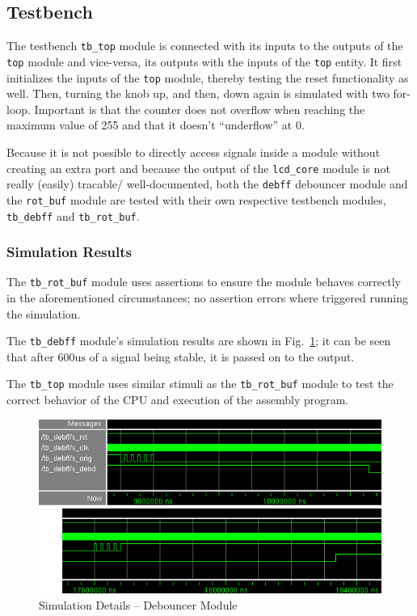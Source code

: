 \documentclass[a4paper,10pt]{scrartcl}
\begin{document}




\subsection{Testbench}
\label{sec:bench}


The testbench \texttt{tb\_top} module is connected with its inputs to the outputs of the \texttt{top} module and vice-versa, its outputs with the inputs of the \texttt{top} entity. 
It first initializes the inputs of the \texttt{top} module, thereby testing the reset functionality as well. 
Then, turning the knob up, and then, down again is simulated with two for-loop. 
Important is that the counter does not overflow when reaching the maximum value of 255 and that it doesn't ``underflow'' at 0.

Because it is not possible to directly access signals inside a module without creating an extra port and because the output of the \texttt{lcd\_core} module is not really (easily) tracable/ well-documented, both the \texttt{debff} debouncer module and the \texttt{rot\_buf} module are tested with their own respective testbench modules, \texttt{tb\_debff} and \texttt{tb\_rot\_buf}. 









\subsubsection{Simulation Results}

The \texttt{tb\_rot\_buf} module uses assertions to ensure the module behaves correctly in the aforementioned circumstances; no assertion errors where triggered running the simulation. 

The \texttt{tb\_debff} module's simulation results are shown in Fig.\ \ref{fig:debff01}; it can be seen that after $600\mathrm{us}$ of a signal being stable, it is passed on to the output. 

The \texttt{tb\_top} module uses similar stimuli as the \texttt{tb\_rot\_buf} module to test the correct behavior of the CPU and execution of the assembly program. 

\begin{figure}[ht]
	\centering
	\includegraphics[keepaspectratio,width=\textwidth]{debff01}
	\caption{Simulation Details -- Debouncer Module}
	\label{fig:debff01}
\end{figure}
\end{document}
